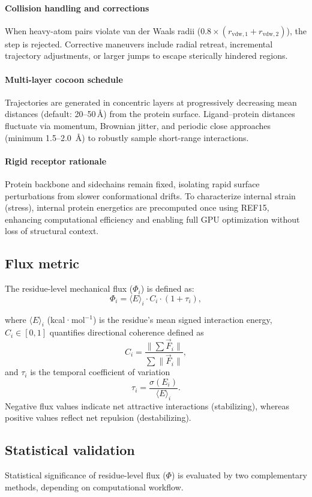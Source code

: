 \documentclass[pdflatex,sn-mathphys-num]{sn-jnl}
\begin{document}
\paragraph{Collision handling and corrections}
When heavy-atom pairs violate van der Waals radii ($0.8\times (r_{\text{vdw},1}+r_{\text{vdw},2})$), the step is rejected. Corrective maneuvers include radial retreat, incremental trajectory adjustments, or larger jumps to escape sterically hindered regions.

\paragraph{Multi-layer cocoon schedule}
Trajectories are generated in concentric layers at progressively decreasing mean distances (default: 20–50\,\AA) from the protein surface. Ligand–protein distances fluctuate via momentum, Brownian jitter, and periodic close approaches (minimum 1.5–2.0~\AA) to robustly sample short-range interactions.

\paragraph{Rigid receptor rationale}
Protein backbone and sidechains remain fixed, isolating rapid surface perturbations from slower conformational drifts. To characterize internal strain (stress), internal protein energetics are precomputed once using REF15, enhancing computational efficiency and enabling full GPU optimization without loss of structural context.

\subsection*{Flux metric}

The residue-level mechanical flux ($\Phi_i$) is defined as:
$$
\Phi_i = \langle E\rangle_i \cdot C_i \cdot (1+\tau_i),
$$

where $\langle E\rangle_i$ (kcal·mol$^{-1}$) is the residue's mean signed interaction energy, $C_i \in [0,1]$ quantifies directional coherence defined as
$$
C_i = \frac{\|\sum\vec F_i\|}{\sum\|\vec F_i\|},
$$
and $\tau_i$ is the temporal coefficient of variation
$$
\tau_i = \frac{\sigma(E_i)}{\langle E\rangle_i}.
$$
Negative flux values indicate net attractive interactions (stabilizing), whereas positive values reflect net repulsion (destabilizing).

\subsection*{Statistical validation}
Statistical significance of residue-level flux ($\Phi$) is evaluated by two complementary methods, depending on computational workflow.
\end{document}
